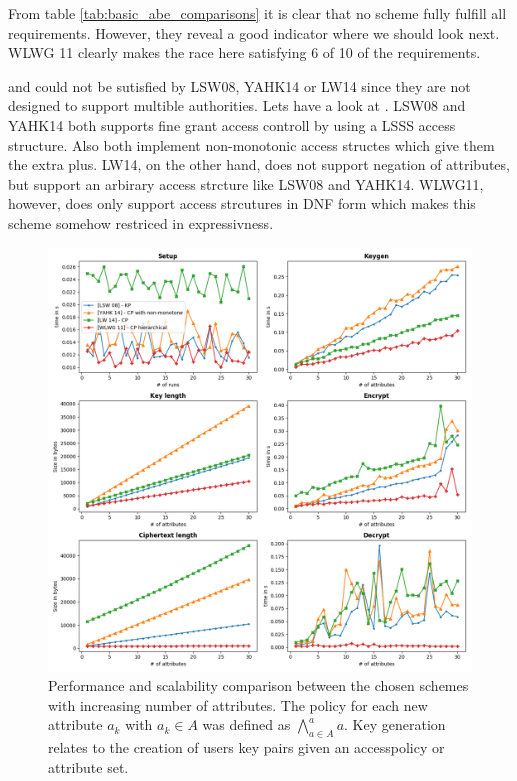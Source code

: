 From table \ref{tab:basic_abe_comparisons} it is clear that no scheme fully fulfill all requirements. However, they reveal a good indicator where we should look next. WLWG 11 clearly makes the race here satisfying 6 of 10 of the requirements. 

 and  could not be sutisfied by LSW08, YAHK14 or LW14 since they are not designed to support multible authorities. 
Lets have a look at . LSW08 and YAHK14 both supports fine grant access controll by using a \ac{LSSS} access structure. Also both implement non-monotonic access structes which give them the extra plus. LW14, on the other hand, does not support negation of attributes, but support an arbirary access strcture like LSW08 and YAHK14. WLWG11, however, does only support access strcutures in \ac{DNF} form which makes this scheme somehow restriced in expressivness. 

\begin{figure}[!ht]
\centering
    \includegraphics[width=1\linewidth]{img/basic_abe_comparisons.png}
    \caption{Performance and scalability comparison between the chosen schemes with increasing number of attributes. The policy for each new attribute $a_k$ with $a_k \in A$ was defined as $\bigwedge\limits_{a \in A}^a a$. Key generation relates to the creation of users key pairs given an accesspolicy or attribute set.}
    \label{fig:basic_abe_comparison}
\end{figure}

